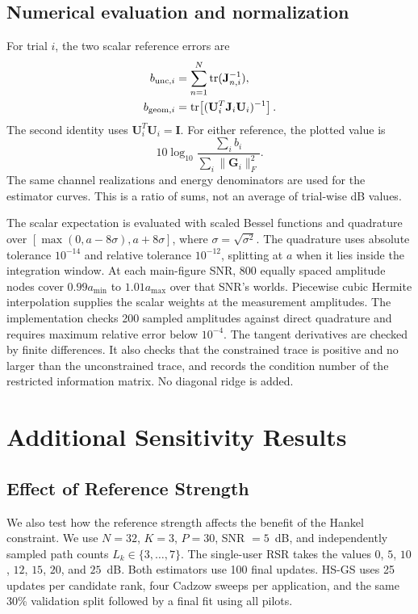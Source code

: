 \documentclass[journal]{IEEEtran}
\begin{document}
\subsection{Numerical evaluation and normalization}

For trial $i$, the two scalar reference errors are
\begin{align}
b_{{\rm unc},i}&=\sum_{n=1}^{N}\operatorname{tr}(\mathbf J_{n,i}^{-1}),\\
b_{{\rm geom},i}&=
 \operatorname{tr}\!\left[(\mathbf U_i^T\mathbf J_i\mathbf U_i)^{-1}\right].
\end{align}
The second identity uses $\mathbf U_i^T\mathbf U_i=\mathbf I$.
For either reference, the plotted value is
\begin{equation}
10\log_{10}
 \frac{\sum_i b_i}{\sum_i\|\mathbf G_i\|_F^2}.
\label{eq:revision-bound-normalization}
\end{equation}
The same channel realizations and energy denominators are used for the
estimator curves. This is a ratio of sums, not an average of trial-wise
dB values.

The scalar expectation is evaluated with scaled Bessel functions and
quadrature over $[\max(0,a-8\sigma),a+8\sigma]$, where
$\sigma=\sqrt{\sigma^2}$. The quadrature uses absolute tolerance
$10^{-14}$ and relative tolerance $10^{-12}$, splitting at $a$ when it
lies inside the integration window. At each main-figure SNR, 800 equally
spaced amplitude nodes cover $0.99a_{\min}$ to $1.01a_{\max}$ over that
SNR's worlds. Piecewise cubic Hermite interpolation supplies the scalar
weights at the measurement amplitudes. The implementation checks 200
sampled amplitudes against direct quadrature and requires maximum relative
error below $10^{-4}$. The tangent derivatives are checked by finite
differences. It also checks that the constrained trace is positive and
no larger than the unconstrained trace, and records the condition number
of the restricted information matrix. No diagonal ridge is added.

\section{Additional Sensitivity Results}
\label{app:additional-sensitivity}
\subsection{Effect of Reference Strength}
\label{sec:revision-rsr}

We also test how the reference strength affects the benefit of the Hankel
constraint. We use $N=32$, $K=3$, $P=30$, SNR $=5$~dB, and independently
sampled path counts $L_k\in\{3,\ldots,7\}$. The single-user RSR takes
the values $0$, $5$, $10$, $12$, $15$, $20$, and $25$~dB. Both estimators
use 100 final updates. HS-GS uses 25 updates per candidate rank, four
Cadzow sweeps per application, and the same 30\% validation split followed
by a final fit using all pilots.
\end{document}
